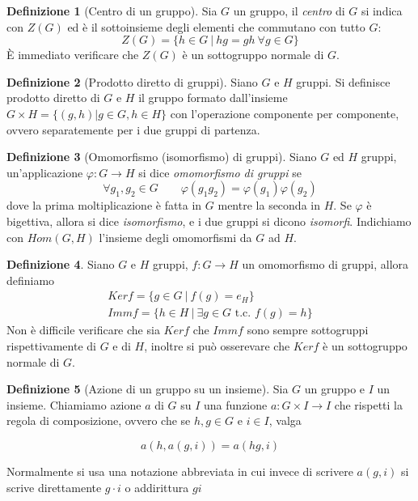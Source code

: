 \documentclass[11pt]{article}
\theoremstyle{plain}
\theoremstyle{definition}
\newtheorem{defn}{Definizione}[section]
\theoremstyle{remark}
\begin{document}
\begin{defn}[Centro di un gruppo]
	Sia $G$ un gruppo, il \textit{centro} di $G$ si indica con $Z(G)$ ed è il sottoinsieme degli elementi che commutano con tutto $G$:
	\[
		Z(G)=\{ h\in G\ |\ hg=gh\ \forall g\in G \}
	\]
	\`E immediato verificare che $Z(G)$ è un sottogruppo normale di $G$.

\end{defn}

\begin{defn}[Prodotto diretto di gruppi]
Siano $G$ e $H$ gruppi. Si definisce prodotto diretto di $G$ e $H$ il gruppo formato dall'insieme $G \times H = \{ (g, h) | g \in G, h \in H\}$ con l'operazione componente per componente, ovvero separatemente per i due gruppi di partenza.
\end{defn}


\begin{defn}[Omomorfismo (isomorfismo) di gruppi]
Siano $G$ ed $H$ gruppi, un'applicazione $\varphi:G\to H$ si dice \textit{omomorfismo di gruppi} se
\[
	\forall g_1,g_2\in G\qquad \varphi(g_1 g_2)=\varphi(g_1)\varphi(g_2)
\]
dove la prima moltiplicazione è fatta in $G$ mentre la seconda in $H$.
Se $\varphi$ è bigettiva, allora si dice \textit{isomorfismo}, e i due gruppi si dicono \emph{isomorfi}.
Indichiamo con $Hom(G,H)$ l'insieme degli omomorfismi da $G$ ad $H$.
\end{defn}

\begin{defn}
	Siano $G$ e $H$ gruppi, $f:G\to H$ un omomorfismo di gruppi, allora definiamo
	\begin{gather*}
		Ker f = \{g\in G\ |\ f(g)=e_H\}\\
		Imm f =\{ h\in H\ |\ \exists g\in G\text{ t.c. }f(g)=h\}
	\end{gather*}
	Non è difficile verificare che sia $Ker f$ che $Imm f$ sono sempre sottogruppi rispettivamente di $G$ e di $H$, inoltre si può osserevare che $Ker f$ è un sottogruppo normale di $G$.
\end{defn}


\begin{defn}[Azione di un gruppo su un insieme] Sia $G$ un gruppo e $I$ un insieme. Chiamiamo azione $a$ di $G$ su $I$ una funzione $a:G\times I \to I$ che rispetti la regola di composizione, ovvero che se $h,g\in G$ e $i \in I$, valga

\[ a(h,a(g,i)) = a(hg, i) \]

Normalmente si usa una notazione abbreviata in cui invece di scrivere $a(g,i)$ si scrive direttamente $g\cdot i$ o addirittura $gi$


\label{defn:azione}
\end{defn}
\end{document}

